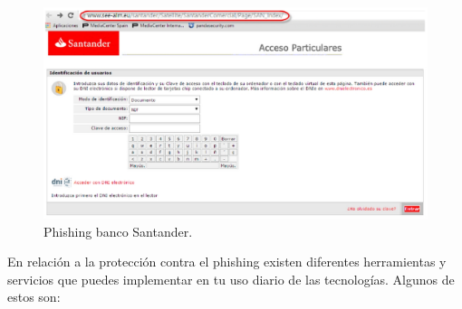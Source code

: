 \documentclass[
  spanish,
  a4paper,
  openany]{book}
\begin{document}
\begin{figure}

{\centering \includegraphics[width=0.75\linewidth]{images/phishing} 

}

\caption{Phishing banco Santander.}\label{fig:unnamed-chunk-16}
\end{figure}

En relación a la protección contra el phishing existen diferentes herramientas y servicios que puedes implementar en tu uso diario de las tecnologías. Algunos de estos son:
\end{document}

